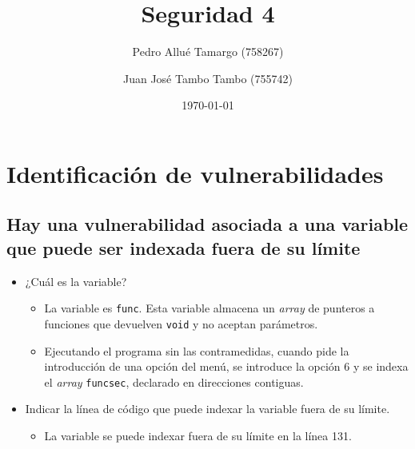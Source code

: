 \documentclass[10pt,a4paper]{article}
\begin{document}
\begin{titlepage}
\title{\textbf{Seguridad 4}}
\author{
	Pedro Allué Tamargo (758267)
	\and
	Juan José Tambo Tambo (755742)
}
\date{\today}
\clearpage\maketitle
\thispagestyle{empty}
\tableofcontents
\end{titlepage}

\section{Identificación de vulnerabilidades}

\subsection{Hay una vulnerabilidad asociada a una variable que puede ser indexada fuera de su límite}
\begin{itemize}
\item ¿Cuál es la variable?
	\begin{itemize}
	\item La variable es \texttt{func}. Esta variable almacena un \emph{array} de punteros a funciones que devuelven \texttt{void} y no aceptan parámetros.
	\item Ejecutando el programa sin las contramedidas, cuando pide la introducción de una opción del menú, se introduce la opción 6 y se indexa el \emph{array} \texttt{funcsec}, declarado en direcciones contiguas.
	\end{itemize}
\item Indicar la línea de código que puede indexar la variable fuera de su límite.
	\begin{itemize}
	\item La variable se puede indexar fuera de su límite en la línea 131.
	\end{itemize}
\end{itemize}
\end{document}

